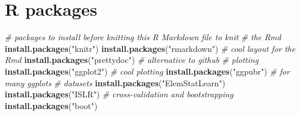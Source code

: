 \documentclass[]{article}
\newenvironment{Shaded}{\begin{snugshade}}{\end{snugshade}}
\newcommand{\KeywordTok}[1]{\textcolor[rgb]{0.13,0.29,0.53}{\textbf{#1}}}
\newcommand{\StringTok}[1]{\textcolor[rgb]{0.31,0.60,0.02}{#1}}
\newcommand{\CommentTok}[1]{\textcolor[rgb]{0.56,0.35,0.01}{\textit{#1}}}
\newcommand{\NormalTok}[1]{#1}
\begin{document}
\section{ R packages}\label{r-packages}

\footnotesize

\begin{Shaded}
\begin{Highlighting}[]
\CommentTok{# packages to install before knitting this R Markdown file to knit}
\CommentTok{# the Rmd}
\KeywordTok{install.packages}\NormalTok{(}\StringTok{"knitr"}\NormalTok{)}
\KeywordTok{install.packages}\NormalTok{(}\StringTok{"rmarkdown"}\NormalTok{)}
\CommentTok{# cool layout for the Rmd}
\KeywordTok{install.packages}\NormalTok{(}\StringTok{"prettydoc"}\NormalTok{)  }\CommentTok{# alternative to github}
\CommentTok{# plotting}
\KeywordTok{install.packages}\NormalTok{(}\StringTok{"ggplot2"}\NormalTok{)  }\CommentTok{# cool plotting}
\KeywordTok{install.packages}\NormalTok{(}\StringTok{"ggpubr"}\NormalTok{)  }\CommentTok{# for many ggplots}
\CommentTok{# datasets}
\KeywordTok{install.packages}\NormalTok{(}\StringTok{"ElemStatLearn"}\NormalTok{)}
\KeywordTok{install.packages}\NormalTok{(}\StringTok{"ISLR"}\NormalTok{)}
\CommentTok{# cross-validation and bootstrapping}
\KeywordTok{install.packages}\NormalTok{(}\StringTok{"boot"}\NormalTok{)}
\end{Highlighting}
\end{Shaded}
\end{document}
